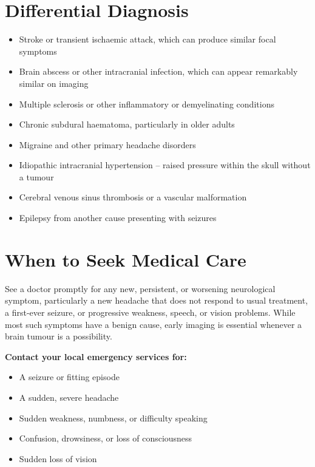 \section*{Differential Diagnosis}
\begin{itemize}
    \item Stroke or transient ischaemic attack, which can produce similar focal symptoms
    \item Brain abscess or other intracranial infection, which can appear remarkably similar on imaging
    \item Multiple sclerosis or other inflammatory or demyelinating conditions
    \item Chronic subdural haematoma, particularly in older adults
    \item Migraine and other primary headache disorders
    \item Idiopathic intracranial hypertension -- raised pressure within the skull without a tumour
    \item Cerebral venous sinus thrombosis or a vascular malformation
    \item Epilepsy from another cause presenting with seizures
\end{itemize}

\section*{When to Seek Medical Care}
See a doctor promptly for any new, persistent, or worsening neurological symptom, particularly a new headache that does not respond to usual treatment, a first-ever seizure, or progressive weakness, speech, or vision problems. While most such symptoms have a benign cause, early imaging is essential whenever a brain tumour is a possibility.

\textbf{Contact your local emergency services for:}
\begin{itemize}
    \item A seizure or fitting episode
    \item A sudden, severe headache
    \item Sudden weakness, numbness, or difficulty speaking
    \item Confusion, drowsiness, or loss of consciousness
    \item Sudden loss of vision
\end{itemize}

